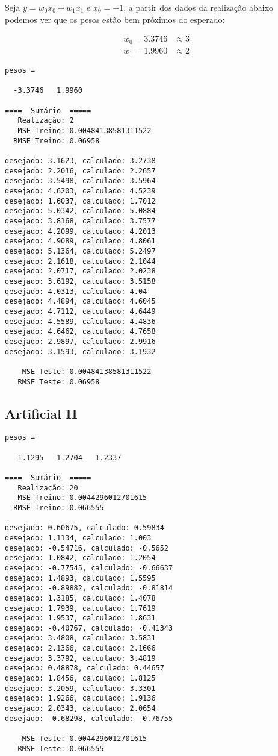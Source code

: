 Seja \(y = w_0 x_0 + w_1 x_1\) e \(x_0 = -1\), a partir dos dados da
realização abaixo podemos ver que os pesos estão bem próximos do
esperado:

\begin{align}
w_0 = 3.3746 &\approx 3 \\
w_1 = 1.9960 &\approx 2
\end{align}

\begin{verbatim}
pesos =

  -3.3746   1.9960

====  Sumário  =====
   Realização: 2
   MSE Treino: 0.00484138581311522
  RMSE Treino: 0.06958

desejado: 3.1623, calculado: 3.2738
desejado: 2.2016, calculado: 2.2657
desejado: 3.5498, calculado: 3.5964
desejado: 4.6203, calculado: 4.5239
desejado: 1.6037, calculado: 1.7012
desejado: 5.0342, calculado: 5.0884
desejado: 3.8168, calculado: 3.7577
desejado: 4.2099, calculado: 4.2013
desejado: 4.9089, calculado: 4.8061
desejado: 5.1364, calculado: 5.2497
desejado: 2.1618, calculado: 2.1044
desejado: 2.0717, calculado: 2.0238
desejado: 3.6192, calculado: 3.5158
desejado: 4.0313, calculado: 4.04
desejado: 4.4894, calculado: 4.6045
desejado: 4.7112, calculado: 4.6449
desejado: 4.5589, calculado: 4.4836
desejado: 4.6462, calculado: 4.7658
desejado: 2.9897, calculado: 2.9916
desejado: 3.1593, calculado: 3.1932

    MSE Teste: 0.00484138581311522
   RMSE Teste: 0.06958
\end{verbatim}

\subsection{Artificial II}\label{artificial-ii-1}

\begin{verbatim}
pesos =

  -1.1295   1.2704   1.2337

====  Sumário  =====
   Realização: 20
   MSE Treino: 0.0044296012701615
  RMSE Treino: 0.066555

desejado: 0.60675, calculado: 0.59834
desejado: 1.1134, calculado: 1.003
desejado: -0.54716, calculado: -0.5652
desejado: 1.0842, calculado: 1.2054
desejado: -0.77545, calculado: -0.66637
desejado: 1.4893, calculado: 1.5595
desejado: -0.89882, calculado: -0.81814
desejado: 1.3185, calculado: 1.4078
desejado: 1.7939, calculado: 1.7619
desejado: 1.9537, calculado: 1.8631
desejado: -0.40767, calculado: -0.41343
desejado: 3.4808, calculado: 3.5831
desejado: 2.1366, calculado: 2.1666
desejado: 3.3792, calculado: 3.4819
desejado: 0.48878, calculado: 0.44657
desejado: 1.8456, calculado: 1.8125
desejado: 3.2059, calculado: 3.3301
desejado: 1.9266, calculado: 1.9136
desejado: 2.0343, calculado: 2.0654
desejado: -0.68298, calculado: -0.76755

    MSE Teste: 0.0044296012701615
   RMSE Teste: 0.066555
\end{verbatim}

